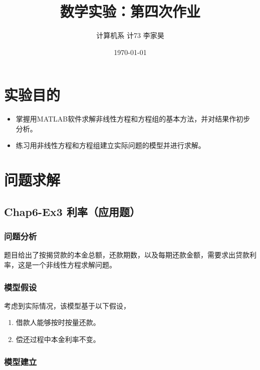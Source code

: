 \documentclass[12pt,a4paper]{article}
\title{数学实验：第四次作业}
\author{计算机系 \quad 计73 \quad 2017011620 \quad 李家昊}
\date{\today}
\begin{document}
\maketitle

\section{实验目的}

\begin{itemize}
    \item 掌握用MATLAB软件求解非线性方程和方程组的基本方法，并对结果作初步分析。
    \item 练习用非线性方程和方程组建立实际问题的模型并进行求解。
\end{itemize}

\section{问题求解}

\subsection{Chap6-Ex3 利率（应用题）}

\subsubsection{问题分析}

题目给出了按揭贷款的本金总额，还款期数，以及每期还款金额，需要求出贷款利率，这是一个非线性方程求解问题。

\subsubsection{模型假设}

考虑到实际情况，该模型基于以下假设，
\begin{enumerate}
    \item 借款人能够按时按量还款。
    \item 偿还过程中本金利率不变。
\end{enumerate}

\subsubsection{模型建立}
\end{document}
